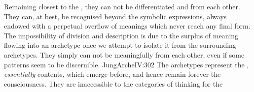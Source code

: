 \pa Remaining closest to the , they can not be differentiated and
 from each other.  They can, at best, be recognised
beyond the symbolic expressions, always endowed with a perpetual overflow of
meanings which never reach any final form. The impossibility of 
division and description is due to the surplus of meaning flowing into an
archetype once we attempt to isolate it from the surrounding archetypes.  They
simply can not be meaningfully  from each other, even if some
patterns seem to be discernible.  \citet{It is a well-nigh hopeless undertaking
  to tear a single archetype out of the living tissue of the psyche; but despite
  their interwovenness they do form units of meaning that can be apprehended
  intuitively.}{JungArche}{IV:302} The archetypes represent the ,
{\em essentially}  contents, which emerge before, and hence
remain forever  the  consciousness. They are inaccessible
to the  categories of  thinking for the
